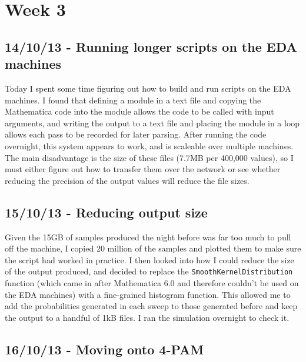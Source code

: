 \section{Week 3}

\subsection{14/10/13 - Running longer scripts on the EDA machines}

Today I spent some time figuring out how to build and run scripts on the
EDA machines. I found that defining a module in a text file and copying
the Mathematica code into the module allows the code to be called with
input arguments, and writing the output to a text file and placing the
module in a loop allows each pass to be recorded for later
parsing. After running the code overnight, this
system appears to work, and is scaleable over multiple machines. The
main disadvantage is the size of these files (7.7MB per 400,000 values),
so I must either figure out how to transfer them over the network or see
whether reducing the precision of the output values will reduce the file
sizes.

\subsection{15/10/13 - Reducing output size}

Given the 15GB of samples produced the night before was far too much to
pull off the machine, I copied 20 million of the samples and plotted
them to make sure the script had worked in practice. I then looked into how
I could reduce the size of the output produced, and decided to replace
the \texttt{SmoothKernelDistribution} function (which came in after
Mathematica 6.0 and therefore couldn't be used on the EDA machines) with
a fine-grained histogram function. This
allowed me to add the probabilities generated in each sweep to those
generated before and keep the output to a handful of 1kB files. I ran
the simulation overnight to check it.

\subsection{16/10/13 - Moving onto 4-PAM}

